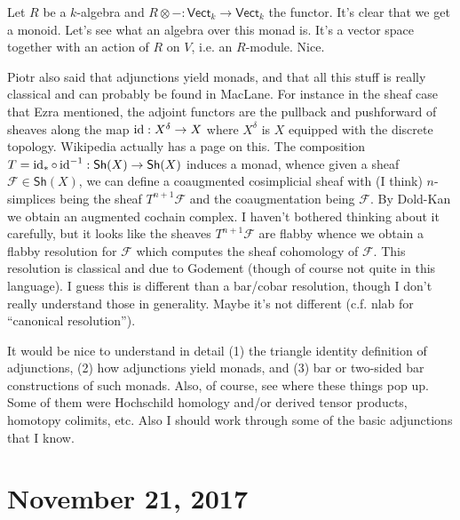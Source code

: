 \documentclass{amsart}
\begin{document}
Let $R$ be a $k$-algebra and $R\otimes-:\mathsf{Vect}_k\to\mathsf{Vect}_k$ the
functor. It's clear that we get a monoid. Let's see what an algebra over this
monad is. It's a vector space together with an action of $R$ on $V$, i.e. an
$R$-module. Nice.

Piotr also said that adjunctions yield monads, and that all this stuff is really
classical and can probably be found in MacLane. For instance in the sheaf case
that Ezra mentioned, the adjoint functors are the pullback and pushforward of
sheaves along the map $\operatorname{id}:X^\delta\to X$ where $X^\delta$ is $X$ equipped with
the discrete topology. Wikipedia actually has a page on this. The composition
$T=\operatorname{id}_*\circ\operatorname{id}^{-1}:\mathsf{Sh}(X)\to\mathsf{Sh}(X)$ induces a monad, whence
given a sheaf $\mathcal{F}\in\mathsf{Sh}(X)$, we can define a coaugmented cosimplicial
sheaf with (I think) $n$-simplices being the sheaf $T^{n+1}\mathcal{F}$ and the
coaugmentation being $\mathcal{F}$. By Dold-Kan we obtain an augmented cochain
complex. I haven't bothered thinking about it carefully, but it looks like the
sheaves $T^{n+1}\mathcal{F}$ are flabby whence we obtain a flabby resolution
for $\mathcal{F}$ which computes the sheaf cohomology of $\mathcal{F}$. This
resolution is classical and due to Godement (though of course not quite in this
language). I guess this is different than a bar/cobar resolution, though I don't
really understand those in generality. Maybe it's not different (c.f. nlab for
``canonical resolution'').

It would be nice to understand in detail (1) the triangle identity definition
of adjunctions, (2) how adjunctions yield monads, and (3) bar or two-sided bar
constructions of such monads. Also, of course, see where these things pop up.
Some of them were Hochschild homology and/or derived tensor products, homotopy
colimits, etc. Also I should work through some of the basic adjunctions that
I know.

\section{November 21, 2017}
\end{document}
